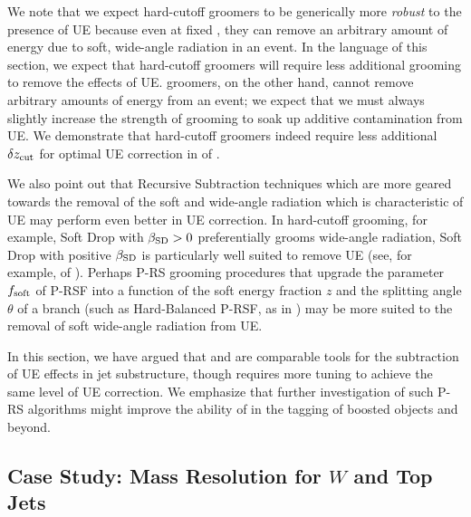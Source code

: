 We note that we expect hard-cutoff groomers to be generically more \textit{robust} to the presence of UE because even at fixed \zcut, they can remove an arbitrary amount of energy due to soft, wide-angle radiation in an event.
%
In the language of this section, we expect that hard-cutoff groomers will require less additional grooming to remove the effects of UE.
%
\PIRANHA{} groomers, on the other hand, cannot remove arbitrary amounts of energy from an event;
%
we expect that we must always slightly increase the strength of \PIRANHA{} grooming to soak up additive contamination from UE.
%
We demonstrate that hard-cutoff groomers indeed require less additional \(\delta z_{\rm cut}\) for optimal UE correction in  of .

    We also point out that Recursive Subtraction techniques which are more geared towards the removal of the soft and wide-angle radiation which is characteristic of UE may perform even better in UE correction.
    In hard-cutoff grooming, for example, Soft Drop with \(\beta_{\rm SD} > 0\) preferentially grooms wide-angle radiation, Soft Drop with positive \(\beta_{\rm SD}\) is particularly well suited to remove UE (see, for example,  of ).
   Perhaps P-RS grooming procedures that upgrade the parameter \(f_{\rm soft}\) of P-RSF into a function of the soft energy fraction \(z\) and the splitting angle \(\theta\) of a branch  (such as Hard-Balanced P-RSF, as in ) may be more suited to the removal of soft wide-angle radiation from UE.

   In this section, we have argued that  and  are comparable tools for the subtraction of UE effects in jet substructure, though  requires more tuning to achieve the same level of UE correction.
   We emphasize that further investigation of such P-RS algorithms might improve the ability of \PIRANHA{} in the tagging of boosted objects and beyond.


\subsection{Case Study: Mass Resolution for \(W\) and Top Jets}
\label{sec:massres}


